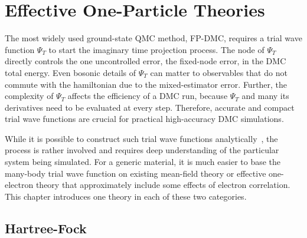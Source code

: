 \section{Effective One-Particle Theories}
The most widely used ground-state QMC method, FP-DMC, requires a trial wave function $\Psi_T$ to start the imaginary time projection process.
The node of $\Psi_T$ directly controls the one uncontrolled error, the fixed-node error, in the DMC total energy.
Even bosonic details of $\Psi_T$ can matter to observables that do not commute with the hamiltonian due to the mixed-estimator error.
Further, the complexity of $\Psi_T$ affects the efficiency of a DMC run, because $\Psi_T$ and many its derivatives need to be evaluated at every step.
Therefore, accurate and compact trial wave functions are crucial for practical high-accuracy DMC simulations.

While it is possible to construct such trial wave functions analytically~\cite{Holzmann2003,Holzmann2006,Pierleoni2008}, the process is rather involved and requires deep understanding of the particular system being simulated.
For a generic material, it is much easier to base the many-body trial wave function on existing mean-field theory or effective one-electron theory that approximately include some effects of electron correlation.
This chapter introduces one theory in each of these two categories.

\subsection{Hartree-Fock}

